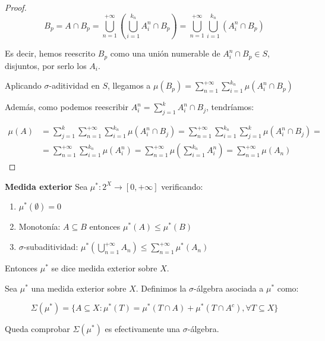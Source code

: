 \begin{proof}
 \[B_p = A \cap B_p = \bigcup_{n=1}^{+\infty} \left(\bigcup_{i=1}^{k_n} A_i^n \cap B_p\right) = 
         \bigcup_{n=1}^{+\infty} \bigcup_{i=1}^{k_n} \left(A_i^n \cap B_p\right)\]
 
 Es decir, hemos reescrito $B_p$ como una unión numerable de $A_i^n \cap B_p \in S$, disjuntos, por serlo los $A_i$. 
 
 Aplicando $\sigma$-aditividad en $S$, llegamos a $\mu(B_p) = \sum_{n=1}^{+\infty} \sum_{i=1}^{k_n} \mu(A_i^n \cap B_p)$
 
 Además, como podemos reescribir $A_i^{n} = \sum_{j=1}^k A_i^{n} \cap B_j$, tendríamos:
 
 \begin{align*}
 \mu(A) &= \sum_{j=1}^k \sum_{n=1}^{+\infty} \sum_{i=1}^{k_n} \mu(A_i^n \cap B_j) = 
           \sum_{n=1}^{+\infty} \sum_{i=1}^{k_n} \sum_{j=1}^k \mu(A_i^n \cap B_j) = \\
        &= \sum_{n=1}^{+\infty} \sum_{i=1}^{k_n} \mu(A_i^n) =
           \sum_{n=1}^{+\infty} \mu \left(\sum_{i=1}^{k_n} A_i^n \right) =
           \sum_{n=1}^{+\infty} \mu(A_n)
 \end{align*}
\end{proof}

\begin{definition} \textbf{Medida exterior}
 Sea $\mu^\ast : 2^X \rightarrow [0, +\infty]$ verificando:
 
 \begin{enumerate}[i]
  \item $\mu^\ast(\emptyset) = 0$
  \item Monotonía: $A\subseteq B$ entonces $\mu^\ast(A) \le \mu^\ast(B)$
  \item $\sigma$-subaditividad: $\mu^\ast \left(\bigcup_{n=1}^{+\infty} A_n \right) \le \sum_{n=1}^{+\infty} \mu^\ast (A_n)$
 \end{enumerate}
 
 Entonces $\mu^\ast$ se dice medida exterior sobre $X$.
\end{definition}

\begin{definition}
 Sea $\mu^\ast$ una medida exterior sobre $X$. Definimos la $\sigma$-álgebra asociada a $\mu^\ast$ como:
 
 \[\Sigma(\mu^\ast) = \{A\subseteq X: \mu^\ast(T) = \mu^\ast(T\cap A) + \mu^\ast(T\cap A^c), \forall T\subseteq X\}\]
\end{definition}

Queda comprobar $\Sigma(\mu^\ast)$ es efectivamente una $\sigma$-álgebra.

